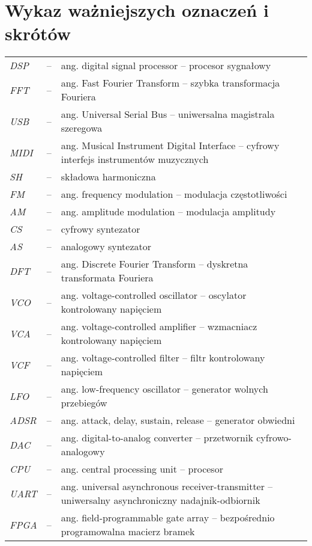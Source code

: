 \chapter*{Wykaz ważniejszych oznaczeń i skrótów}

\begin{tabular}{lcl}
	\textit{DSP} & -- & ang. digital signal processor -- procesor sygnałowy \\
	\textit{FFT} & -- & ang. Fast Fourier Transform -- szybka transformacja Fouriera \\
	\textit{USB} & -- & ang. Universal Serial Bus -- uniwersalna magistrala szeregowa \\
	\textit{MIDI} & -- & ang. Musical Instrument Digital Interface -- cyfrowy interfejs instrumentów muzycznych \\
  \textit{SH} & -- & składowa harmoniczna \\
	\textit{FM} & -- & ang. frequency modulation -- modulacja częstotliwości \\
	\textit{AM} & -- & ang. amplitude modulation -- modulacja amplitudy \\
	\textit{CS} & -- & cyfrowy syntezator \\
	\textit{AS} & -- & analogowy syntezator \\
	\textit{DFT} & -- & ang. Discrete Fourier Transform -- dyskretna transformata Fouriera \\
	\textit{VCO} & -- & ang. voltage-controlled oscillator -- oscylator kontrolowany napięciem \\
	\textit{VCA} & -- & ang. voltage-controlled amplifier -- wzmacniacz kontrolowany napięciem \\
	\textit{VCF} & -- & ang. voltage-controlled filter -- filtr kontrolowany napięciem \\
	\textit{LFO} & -- & ang. low-frequency oscillator -- generator wolnych przebiegów \\
	\textit{ADSR} & -- & ang. attack, delay, sustain, release -- generator obwiedni \\
	\textit{DAC} & -- & ang. digital-to-analog converter -- przetwornik cyfrowo-analogowy \\
	\textit{CPU} & -- & ang. central processing unit -- procesor \\
	\textit{UART} & -- & ang. universal asynchronous receiver-transmitter -- uniwersalny asynchroniczny nadajnik-odbiornik \\
	\textit{FPGA} & -- & ang. field-programmable gate array -- bezpośrednio programowalna macierz bramek \\

\end{tabular}
